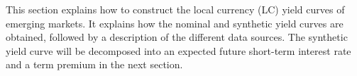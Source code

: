 This section explains how to construct the local currency (LC) yield curves of emerging markets. 
It explains how the nominal and synthetic yield curves are obtained, followed by a description of the different data sources. 
The synthetic yield curve will be decomposed into an expected future short-term interest rate and a term premium in the next section. 

